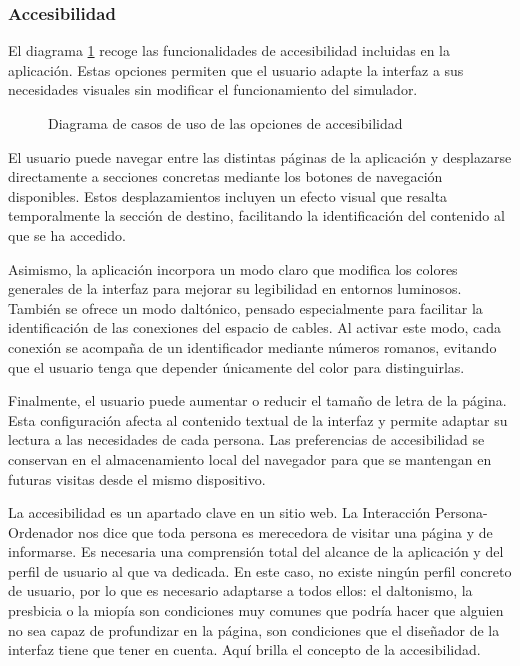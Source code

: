 \subsubsection{Accesibilidad}

El diagrama \ref{casos_uso_accesibilidad} recoge las funcionalidades de accesibilidad incluidas en la aplicación. Estas opciones permiten que el usuario adapte la interfaz a sus necesidades visuales sin modificar el funcionamiento del simulador.

\begin{figure}[htbp]
	\centerline{}
	\caption{Diagrama de casos de uso de las opciones de accesibilidad}
	\label{casos_uso_accesibilidad}
\end{figure}

El usuario puede navegar entre las distintas páginas de la aplicación y desplazarse directamente a secciones concretas mediante los botones de navegación disponibles. Estos desplazamientos incluyen un efecto visual que resalta temporalmente la sección de destino, facilitando la identificación del contenido al que se ha accedido.

Asimismo, la aplicación incorpora un modo claro que modifica los colores generales de la interfaz para mejorar su legibilidad en entornos luminosos. También se ofrece un modo daltónico, pensado especialmente para facilitar la identificación de las conexiones del espacio de cables. Al activar este modo, cada conexión se acompaña de un identificador mediante números romanos, evitando que el usuario tenga que depender únicamente del color para distinguirlas.

Finalmente, el usuario puede aumentar o reducir el tamaño de letra de la página. Esta configuración afecta al contenido textual de la interfaz y permite adaptar su lectura a las necesidades de cada persona. Las preferencias de accesibilidad se conservan en el almacenamiento local del navegador para que se mantengan en futuras visitas desde el mismo dispositivo.

La accesibilidad es un apartado clave en un sitio web. La Interacción Persona-Ordenador nos dice que toda persona es merecedora de visitar una página y de informarse. Es necesaria una comprensión total del alcance de la aplicación y del perfil de usuario al que va dedicada. En este caso, no existe ningún perfil concreto de usuario, por lo que es necesario adaptarse a todos ellos: el daltonismo, la presbicia o la miopía son condiciones muy comunes que podría hacer que alguien no sea capaz de profundizar en la página, son condiciones que el diseñador de la interfaz tiene que tener en cuenta. Aquí brilla el concepto de la accesibilidad.

